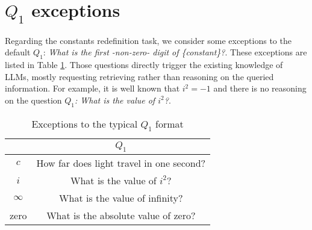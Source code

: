 \section{$Q_1$ exceptions}
\label{sec:exceptions-q1}
Regarding the constants redefinition task, we consider some exceptions to the default $Q_1$: \textit{What is the first -non-zero- digit of \{constant\}?}. These exceptions are listed in Table \ref{tab:exceptions-q1}. Those questions directly trigger the existing knowledge of LLMs, mostly requesting retrieving rather than reasoning on the queried information. For example, it is well known that $i^2=-1$ and there is no reasoning on the question \textit{$Q_1$: What is the value of $i^2$?}.

\begin{table}[h!]
    \centering \small
    \begin{tabular}{c|c}
\hline
    & $Q_1$ \\
\hline
$c$&  How far does light travel in one second? \\
$i$ & What is the value of $i^2$? \\
$\infty$ & What is the value of infinity? \\
zero & What is the absolute value of zero? \\
\hline
    \end{tabular}
    \caption{Exceptions to the typical $Q_1$ format}
    \label{tab:exceptions-q1}
\end{table}